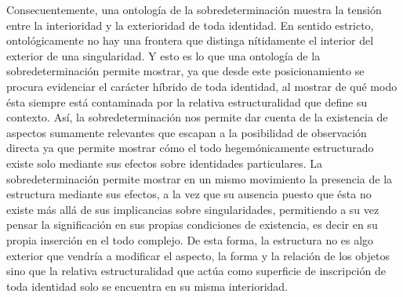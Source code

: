 \documentclass{book}
\begin{document}
Consecuentemente, una ontología de la sobredeterminación muestra la
tensión entre la interioridad y la exterioridad de toda identidad. En
sentido estricto, ontológicamente no hay una frontera que distinga
nítidamente el interior del exterior de una singularidad. Y esto es lo
que una ontología de la sobredeterminación permite mostrar, ya que desde
este posicionamiento se procura evidenciar el carácter híbrido de toda
identidad, al mostrar de qué modo ésta siempre está contaminada por la
relativa estructuralidad que define su contexto. Así, la
sobredeterminación nos permite dar cuenta de la existencia de aspectos
sumamente relevantes que escapan a la posibilidad de observación directa
ya que permite mostrar cómo el todo hegemónicamente estructurado existe
solo mediante sus efectos sobre identidades particulares. La
sobredeterminación permite mostrar en un mismo movimiento la presencia
de la estructura mediante sus efectos, a la vez que su ausencia puesto
que ésta no existe más allá de sus implicancias sobre singularidades,
permitiendo a su vez pensar la significación en sus propias condiciones
de existencia, es decir en su propia inserción en el todo complejo. De
esta forma, la estructura no es algo exterior que vendría a modificar el
aspecto, la forma y la relación de los objetos sino que la relativa
estructuralidad que actúa como superficie de inscripción de toda
identidad solo se encuentra en su misma interioridad.
\end{document}
